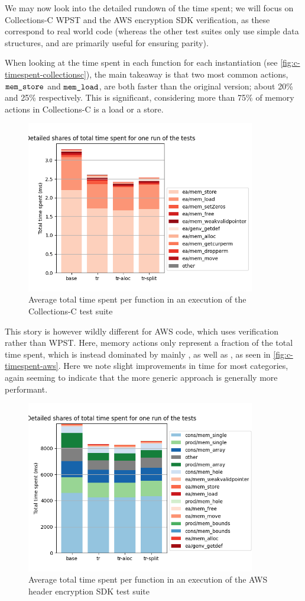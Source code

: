 We may now look into the detailed rundown of the time spent; we will focus on Collections-C WPST and the AWS encryption SDK verification, as these correspond to real world code (whereas the other test suites only use simple data structures, and are primarily useful for ensuring parity).

When looking at the time spent in each function for each instantiation (see \autoref{fig:c-timespent-collectionsc}), the main takeaway is that two most common actions, $\texttt{mem\_store}$ and $\texttt{mem\_load}$, are both faster than the original version; about 20\% and 25\% respectively. This is significant, considering more than 75\% of memory actions in Collections-C is a load or a store.

\begin{figure}
	\centering
	\includegraphics[width=10cm]{figures/c-timespent-collectionsc.png}
	\caption{Average total time spent per function in an execution of the Collections-C test suite}
	\label{fig:c-timespent-collectionsc}
\end{figure}

This story is however wildly different for AWS code, which uses verification rather than WPST. Here, memory actions only represent a fraction of the total time spent, which is instead dominated by mainly \consume, as well as \produce, as seen in \autoref{fig:c-timespent-aws}. Here we note slight improvements in time for most categories, again seeming to indicate that the more generic approach is generally more performant.

\begin{figure}
	\centering
	\includegraphics[width=10cm]{figures/c-timespent-aws.png}
	\caption{Average total time spent per function in an execution of the AWS header encryption SDK test suite}
	\label{fig:c-timespent-aws}
\end{figure}

